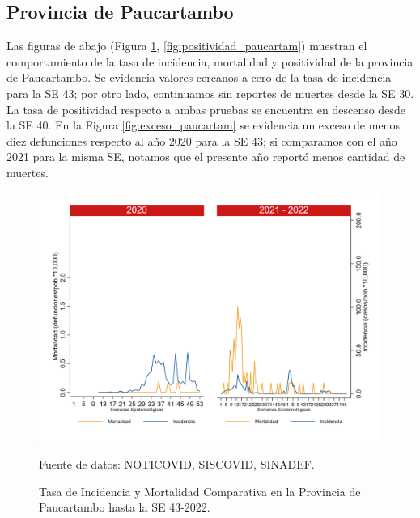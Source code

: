 \documentclass[12pt,a4paper,openany]{book}
\begin{document}
	\subsection*{Provincia de Paucartambo}
	\noindent Las figuras de abajo (Figura \ref{fig:inc_mort_paucartam}, \ref{fig:positividad_paucartam}) muestran el comportamiento de la tasa de incidencia, mortalidad y positividad de la provincia de Paucartambo. Se evidencia valores cercanos a cero de la tasa de incidencia para la SE 43; por otro lado, continuamos sin reportes de muertes desde la SE 30. La tasa de positividad respecto a ambas pruebas se encuentra en descenso desde la SE 40.
	En la Figura \ref{fig:exceso_paucartam} se evidencia un exceso de menos diez defunciones respecto al año 2020 para la SE 43; si comparamos con el año 2021 para la misma SE, notamos que el presente año reportó menos cantidad de muertes.
	\begin{figure}[h]
		\caption{Tasa de Incidencia y Mortalidad Comparativa en la Provincia de Paucartambo hasta la SE 43-2022.}\label{fig:inc_mort_paucartam}
		\begin{center}
			\includegraphics[width=0.85\linewidth]{../figuras/incidencia_mortalidad_20_21_11.png}
		\end{center}
		{\footnotesize {Fuente de datos: NOTICOVID, SISCOVID, SINADEF.}}
	\end{figure}
	
\end{document}
